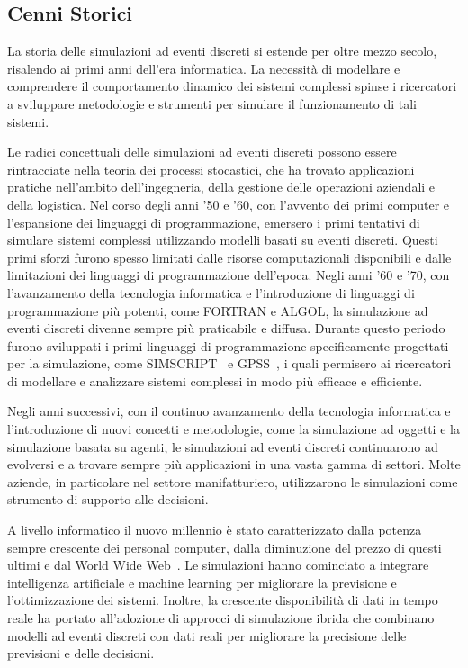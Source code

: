 \documentclass[12pt,a4paper,openright,twoside]{book}
\begin{document}
\subsection{Cenni Storici}
La storia delle simulazioni ad eventi discreti si estende per oltre mezzo secolo, risalendo ai primi anni dell'era informatica. La necessità di modellare e comprendere il comportamento dinamico dei sistemi complessi spinse i ricercatori a sviluppare metodologie e strumenti per simulare il funzionamento di tali sistemi.

Le radici concettuali delle simulazioni ad eventi discreti possono essere rintracciate nella teoria dei processi stocastici, che ha trovato applicazioni pratiche nell'ambito dell'ingegneria, della gestione delle operazioni aziendali e della logistica. Nel corso degli anni '50 e '60, con l'avvento dei primi computer e l'espansione dei linguaggi di programmazione, emersero i primi tentativi di simulare sistemi complessi utilizzando modelli basati su eventi discreti. Questi primi sforzi furono spesso limitati dalle risorse computazionali disponibili e dalle limitazioni dei linguaggi di programmazione dell'epoca.
Negli anni '60 e '70, con l'avanzamento della tecnologia informatica e l'introduzione di linguaggi di programmazione più potenti, come FORTRAN e ALGOL, la simulazione ad eventi discreti divenne sempre più praticabile e diffusa. Durante questo periodo furono sviluppati i primi linguaggi di programmazione specificamente progettati per la simulazione, come SIMSCRIPT~\cite{DBLP:journals/ibmsj/DimsdaleM64} e GPSS~\cite{DBLP:journals/tssc/HollandM68}, i quali permisero ai ricercatori di modellare e analizzare sistemi complessi in modo più efficace e efficiente.

Negli anni successivi, con il continuo avanzamento della tecnologia informatica e l'introduzione di nuovi concetti e metodologie, come la simulazione ad oggetti e la simulazione basata su agenti, le simulazioni ad eventi discreti continuarono ad evolversi e a trovare sempre più applicazioni in una vasta gamma di settori. 
Molte aziende, in particolare nel settore manifatturiero, utilizzarono le simulazioni come strumento di supporto alle decisioni. 

A livello informatico il nuovo millennio è stato caratterizzato dalla potenza sempre crescente dei personal computer, dalla diminuzione del prezzo di questi ultimi e dal World Wide Web~\cite{DBLP:journals/jors/Robinson05}. Le simulazioni hanno cominciato a integrare intelligenza artificiale e machine learning per migliorare la previsione e l'ottimizzazione dei sistemi. Inoltre, la crescente disponibilità di dati in tempo reale ha portato all'adozione di approcci di simulazione ibrida che combinano modelli ad eventi discreti con dati reali per migliorare la precisione delle previsioni e delle decisioni.
\end{document}
